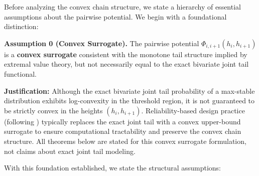 \documentclass[12pt]{article}
\theoremstyle{definition}
\begin{document}
Before analyzing the convex chain structure, we state a hierarchy of essential assumptions about the pairwise potential. We begin with a foundational distinction:

\begin{boxed}
\textbf{Assumption 0 (Convex Surrogate).}
The pairwise potential $\Phi_{i,i+1}(h_i, h_{i+1})$ is a \textbf{convex surrogate} consistent with the monotone tail structure implied by extremal value theory, but not necessarily equal to the exact bivariate joint tail functional.

\noindent\textbf{Justification:} Although the exact bivariate joint tail probability of a max-stable distribution exhibits log-convexity in the threshold region, it is not guaranteed to be strictly convex in the heights $(h_i, h_{i+1})$. Reliability-based design practice (following \cite{Sorensen:Reliability}) typically replaces the exact joint tail with a convex upper-bound surrogate to ensure computational tractability and preserve the convex chain structure. All theorems below are stated for this convex surrogate formulation, not claims about exact joint tail modeling.
\end{boxed}

\noindent With this foundation established, we state the structural assumptions:
\end{document}
